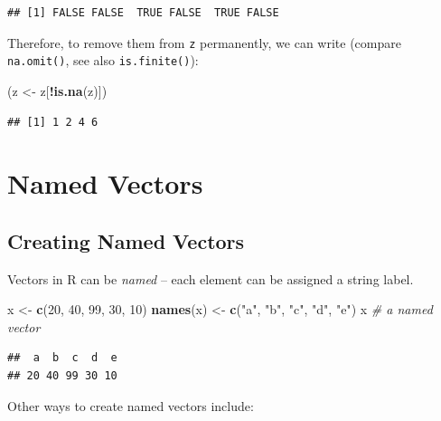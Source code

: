 \documentclass[10pt,b5paper,krantz1]{krantz}
\newenvironment{Shaded}{\begin{snugshade}}{\end{snugshade}}
\newcommand{\CommentTok}[1]{\textcolor[rgb]{0.37,0.37,0.37}{\textit{#1}}}
\newcommand{\DecValTok}[1]{\textcolor[rgb]{0.06,0.06,0.06}{#1}}
\newcommand{\KeywordTok}[1]{\textcolor[rgb]{0.27,0.27,0.27}{\textbf{#1}}}
\newcommand{\NormalTok}[1]{#1}
\newcommand{\OperatorTok}[1]{\textcolor[rgb]{0.43,0.43,0.43}{\textbf{#1}}}
\newcommand{\StringTok}[1]{\textcolor[rgb]{0.5,0.5,0.5}{#1}}
\begin{document}
\begin{verbatim}
## [1] FALSE FALSE  TRUE FALSE  TRUE FALSE
\end{verbatim}

Therefore, to remove them from \texttt{z} permanently,
we can write (compare \texttt{na.omit()}, see also \texttt{is.finite()}):

\begin{Shaded}
\begin{Highlighting}[]
\NormalTok{(z <-}\StringTok{ }\NormalTok{z[}\OperatorTok{!}\KeywordTok{is.na}\NormalTok{(z)])}
\end{Highlighting}
\end{Shaded}

\begin{verbatim}
## [1] 1 2 4 6
\end{verbatim}

\hypertarget{named-vectors}{%
\section{Named Vectors}\label{named-vectors}}

\hypertarget{creating-named-vectors}{%
\subsection{Creating Named Vectors}\label{creating-named-vectors}}

Vectors in R can be \emph{named} -- each element can be assigned a string label.

\begin{Shaded}
\begin{Highlighting}[]
\NormalTok{x <-}\StringTok{ }\KeywordTok{c}\NormalTok{(}\DecValTok{20}\NormalTok{, }\DecValTok{40}\NormalTok{, }\DecValTok{99}\NormalTok{, }\DecValTok{30}\NormalTok{, }\DecValTok{10}\NormalTok{)}
\KeywordTok{names}\NormalTok{(x) <-}\StringTok{ }\KeywordTok{c}\NormalTok{(}\StringTok{"a"}\NormalTok{, }\StringTok{"b"}\NormalTok{, }\StringTok{"c"}\NormalTok{, }\StringTok{"d"}\NormalTok{, }\StringTok{"e"}\NormalTok{)}
\NormalTok{x }\CommentTok{# a named vector}
\end{Highlighting}
\end{Shaded}

\begin{verbatim}
##  a  b  c  d  e 
## 20 40 99 30 10
\end{verbatim}

Other ways to create named vectors include:
\end{document}
